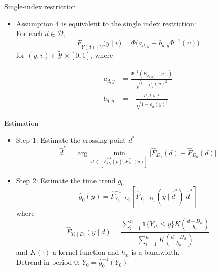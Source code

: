 \documentclass[aspectratio=1610, 9pt]{beamer}
\begin{document}
\begin{frame}{Single-index restriction}
    \begin{itemize}
    \item Assumption 4 is equivalent to the single index restriction:
    \\
    \vspace{0.1cm}
    For each $d\in\mathcal{D}$,
    $$F_{\tilde{Y}(d)\mid V}\big(y\mid v\big)=\Phi\Big( a_{d,y}+b_{d,y}\Phi^{-1}(v)\Big)$$
    for $(y,v)\in\tilde{\mathcal{Y}}\times[0,1]$, where
    
\begin{align*}
    a_{d,y}	&=\frac{\Phi^{-1}\left(F_{\tilde{Y}(d)}(y)\right)}{\sqrt{1-\rho_{d}(y)^{2}}}\\
b_{d,y}	&=-\frac{\rho_{d}(y)}{\sqrt{1-\rho_{d}(y)^{2}}}
\end{align*}

\end{itemize}
\end{frame}



\begin{frame}{Estimation}

\begin{itemize}
    \item Step 1: Estimate the crossing point $d^*$\\
$$\widehat{d}^* = \arg \min_{d\in [\widehat{F}_{D_{0}}^{-1}(\underline{p}),\widehat{F}_{D_{1}}^{-1}(\bar{p}) ]} \Big| \widehat{F}_{D_{1}}(d)-\widehat{F}_{D_{0}}(d) \Big| $$
    \item Step 2: Estimate the time trend $g_0$
    $$\widehat{g}_{0}(y)=\widehat{F}_{Y_{0}\mid D_{0}}^{-1}\left[\widehat{F}_{Y_{1}\mid D_{1}}(y\mid \widehat{d}^*)\big|\widehat{d}^*\right]$$ where
    $$\widehat{F}_{Y_{t}\mid D_{t}}(y\mid d)=\frac{\sum_{i=1}^{n}\mathds{1}\{Y_{it}\leq y\}K\left(\frac{d-D_{it}}{h_{n}}\right)}{\sum_{i=1}^{n}K\left(\frac{d-D_{it}}{h_{n}}\right)}$$ and $K(\cdot)$ a kernel function and $h_n$ is a bandwidth.\\
\vspace{0.2cm}
    Detrend in period 0:  $\tilde{Y}_0 = \widehat{g}_0^{-1}(Y_0)$
\end{itemize}
    
\end{frame}
\end{document}
